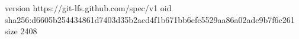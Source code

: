 version https://git-lfs.github.com/spec/v1
oid sha256:d6605b254434861d7403d35b2acd4f1b671bb6efc5529aa86a02adc9b7f6c261
size 2408
